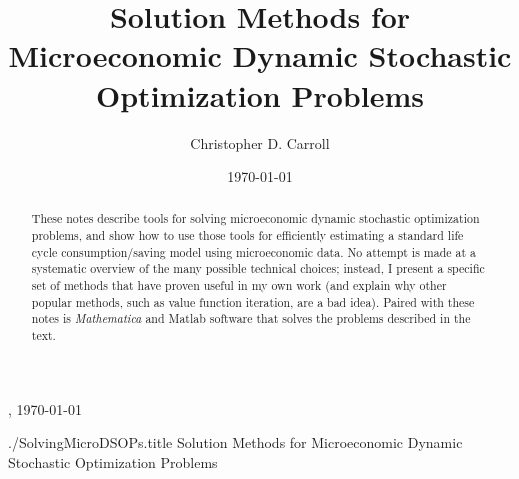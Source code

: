 \documentclass[titlepage]{\econtex}
\providecommand{\textname}{SolvingMicroDSOPs}
\newcommand{\Habits}{\ifthenelse{\boolean{Habits}}}
\begin{document}

\newcommand{\Habits}{\ifthenelse{\boolean{Habits}}}

\hfill{\tiny \jobname, \today}

\begin{verbatimwrite}{./\textname.title}
Solution Methods for Microeconomic Dynamic Stochastic Optimization Problems
\end{verbatimwrite}

\title{Solution Methods for Microeconomic Dynamic Stochastic Optimization Problems}

\author{Christopher D. Carroll\authNum}


\date{\today}

\begin{abstract}
  These notes describe tools for solving microeconomic dynamic
  stochastic optimization problems, and show how to use those tools
  for efficiently estimating a standard life cycle consumption/saving model
  using microeconomic data.  No attempt is made at a systematic
  overview of the many possible technical choices; instead, I present
  a specific set of methods that have proven useful in my own work
  (and explain why other popular methods, such as value function
  iteration, are a bad idea).  Paired with these notes is \textit{Mathematica} and Matlab software that solves the problems
  described in the text.
\end{abstract}


\maketitle
\end{document}
